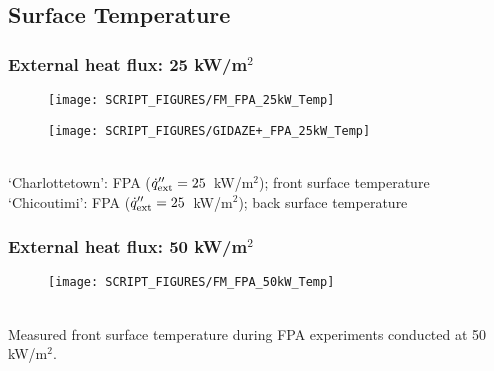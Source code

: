 \newpage
\subsection{Surface Temperature}
\label{Gas_Temp}
\subsubsection{External heat flux: 25 kW/m$^2$}
\begin{minipage}{0.5\textwidth}
\begin{figure}[H]
{\texttt{[image: SCRIPT\_FIGURES/FM\_FPA\_25kW\_Temp]}}\\
\end{figure}
\end{minipage}
\begin{minipage}{0.35\textwidth}
\begin{figure}[H]
{\texttt{[image: SCRIPT\_FIGURES/GIDAZE+\_FPA\_25kW\_Temp]}}\\
\end{figure}
\end{minipage}\\
‘Charlottetown’:  FPA ($\dot{q}_{\rm ext}'' = 25$~kW/m$^2$); front surface temperature \\
‘Chicoutimi’:   FPA ($\dot{q}_{\rm ext}'' = 25$~kW/m$^2$); back surface temperature \\
\vfill


\subsubsection{External heat flux: 50 kW/m$^2$}
\begin{minipage}{0.5\textwidth}
\begin{figure}[H]
{\texttt{[image: SCRIPT\_FIGURES/FM\_FPA\_50kW\_Temp]}}\\
\end{figure}
\end{minipage}\\
Measured front surface temperature during FPA experiments conducted at 50 kW/m$^2$. 
\vfill
\newpage
